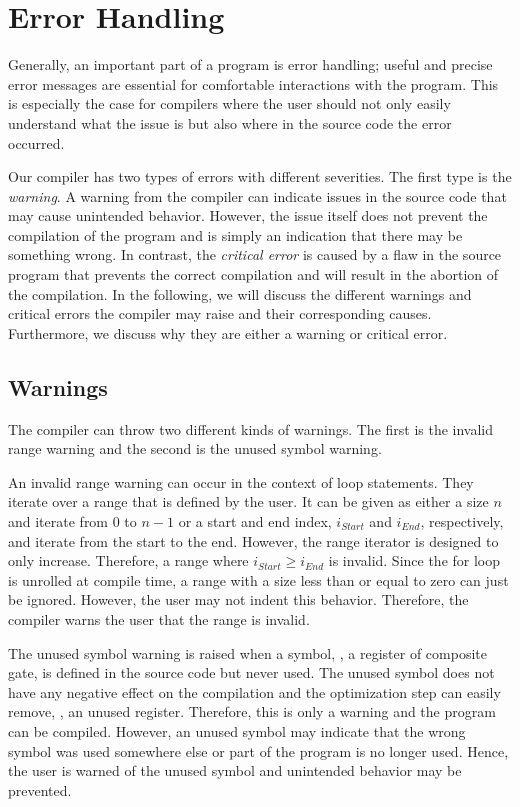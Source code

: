 \section{Error Handling}
Generally, an important part of a program is error handling; useful and precise error messages are essential for comfortable interactions with the program. This is especially the case for compilers where the user should not only easily understand what the issue is but also where in the source code the error occurred.  

Our compiler has two types of errors with different severities. The first type is the \emph{warning}. A warning from the compiler can indicate issues in the source code that may cause unintended behavior. However, the issue itself does not prevent the compilation of the program and is simply an indication that there may be something wrong. In contrast, the \emph{critical error} is caused by a flaw in the source program that prevents the correct compilation and will result in the abortion of the compilation. In the following, we will discuss the different warnings and critical errors the compiler may raise and their corresponding causes. Furthermore, we discuss why they are either a warning or critical error. 

\subsection{Warnings}
The compiler can throw two different kinds of warnings. The first is the invalid range warning and the second is the unused symbol warning.

An invalid range warning can occur in the context of loop statements. They iterate over a range that is defined by the user. It can be given as either a size $n$ and iterate from $0$ to $n-1$ or a start and end index, $i_{Start}$ and $i_{End}$, respectively, and iterate from the start to the end. However, the range iterator is designed to only increase. Therefore, a range where $i_{Start} \geq i_{End}$ is invalid. Since the for loop is unrolled at compile time, a range with a size less than or equal to zero can just be ignored. However, the user may not indent this behavior. Therefore, the compiler warns the user that the range is invalid.

The unused symbol warning is raised when a symbol, \eg, a register of composite gate, is defined in the source code but never used. The unused symbol does not have any negative effect on the compilation and the optimization step can easily remove, \eg, an unused register. Therefore, this is only a warning and the program can be compiled. However, an unused symbol may indicate that the wrong symbol was used somewhere else or part of the program is no longer used. Hence, the user is warned of the unused symbol and unintended behavior may be prevented.

